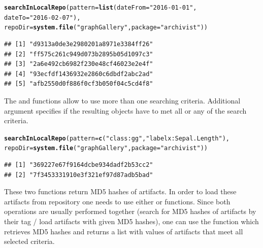 \documentclass[nojss]{jss}\usepackage[]{graphicx}\usepackage[]{color}
\makeatletter
\newcommand{\hlstr}[1]{\textcolor[rgb]{0.192,0.494,0.8}{#1}}%
\newcommand{\hlstd}[1]{\textcolor[rgb]{0.345,0.345,0.345}{#1}}%
\newcommand{\hlkwc}[1]{\textcolor[rgb]{0.333,0.667,0.333}{#1}}%
\newcommand{\hlkwd}[1]{\textcolor[rgb]{0.737,0.353,0.396}{\textbf{#1}}}%
\newenvironment{kframe}{%
 \def\at@end@of@kframe{}%
 \ifinner\ifhmode%
  \def\at@end@of@kframe{\end{minipage}}%
  \begin{minipage}{\columnwidth}%
 \fi\fi%
 \def\FrameCommand##1{\hskip\@totalleftmargin \hskip-\fboxsep
 \colorbox{shadecolor}{##1}\hskip-\fboxsep
     \hskip-\linewidth \hskip-\@totalleftmargin \hskip\columnwidth}%
 \MakeFramed {\advance\hsize-\width
   \@totalleftmargin\z@ \linewidth\hsize
   \@setminipage}}%
 {\par\unskip\endMakeFramed%
 \at@end@of@kframe}
\newenvironment{knitrout}{}{} %
\makeatother
\begin{document}
\begin{knitrout}
\color{fgcolor}\begin{kframe}
\begin{alltt}
\hlkwd{searchInLocalRepo}\hlstd{(}\hlkwc{pattern} \hlstd{=} \hlkwd{list}\hlstd{(}\hlkwc{dateFrom} \hlstd{=} \hlstr{"2016-01-01"}\hlstd{,}
    \hlkwc{dateTo} \hlstd{=} \hlstr{"2016-02-07"}\hlstd{),}
    \hlkwc{repoDir} \hlstd{=} \hlkwd{system.file}\hlstd{(}\hlstr{"graphGallery"}\hlstd{,} \hlkwc{package} \hlstd{=} \hlstr{"archivist"}\hlstd{))}
\end{alltt}
\begin{verbatim}
## [1] "d9313a0de3e2980201a8971e3384ff26"
## [2] "ff575c261c949d073b2895b05d1097c3"
## [3] "2a6e492cb6982f230e48cf46023e2e4f"
## [4] "93ecfdf1436932e2860c6dbdf2abc2ad"
## [5] "afb2550d0f886f0cf3b050f04c5cd4f8"
\end{verbatim}
\end{kframe}
\end{knitrout}

The  and  functions allow to use more than one searching criteria. Additional argument  specifies if the resulting objects have to met all or any of the search criteria.

\begin{knitrout}
\color{fgcolor}\begin{kframe}
\begin{alltt}
\hlkwd{searchInLocalRepo}\hlstd{(}\hlkwc{pattern}\hlstd{=}\hlkwd{c}\hlstd{(}\hlstr{"class:gg"}\hlstd{,} \hlstr{"labelx:Sepal.Length"}\hlstd{),}
    \hlkwc{repoDir} \hlstd{=} \hlkwd{system.file}\hlstd{(}\hlstr{"graphGallery"}\hlstd{,} \hlkwc{package} \hlstd{=} \hlstr{"archivist"}\hlstd{))}
\end{alltt}
\begin{verbatim}
## [1] "369227e67f9164dcbe934dadf2b53cc2"
## [2] "7f3453331910e3f321ef97d87adb5bad"
\end{verbatim}
\end{kframe}
\end{knitrout}

These two functions return MD5 hashes of artifacts. In order to load these artifacts from repository one needs to use either  or  functions.
Since both operations are usually performed together (search for MD5 hashes of artifacts by their tag / load artifacts with given MD5 hashes), one can use the  function which retrieves MD5 hashes and returns a list with values of artifacts that meet all selected criteria.
\end{document}
